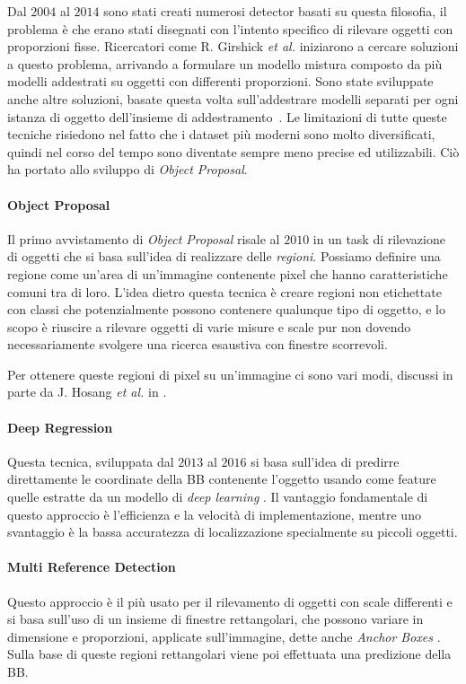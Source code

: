 Dal $2004$ al $2014$ sono stati creati numerosi detector basati su questa filosofia, il problema è che erano stati disegnati con l'intento specifico di rilevare oggetti con proporzioni fisse. Ricercatori come R. Girshick \textit{et al.} iniziarono a cercare soluzioni a questo problema, arrivando a formulare un modello mistura \cite{felzenszwalb2009object} composto da più modelli addestrati su oggetti con differenti proporzioni. Sono state sviluppate anche altre soluzioni, basate questa volta sull'addestrare modelli separati per ogni istanza di oggetto dell'insieme di addestramento \cite{malisiewicz2011ensemble, malisiewicz2011exemplar}. Le limitazioni di tutte queste tecniche risiedono nel fatto che i dataset più moderni sono molto diversificati, quindi nel corso del tempo sono diventate sempre meno precise ed utilizzabili. Ciò ha portato allo sviluppo di \textit{Object Proposal}.
\paragraph{Object Proposal}
Il primo avvistamento di \textit{Object Proposal} risale al $2010$ in un task di rilevazione di oggetti \cite{alexe2010object} che si basa sull'idea di realizzare delle \textit{regioni}.
Possiamo definire una regione come un'area di un'immagine contenente pixel che hanno caratteristiche comuni tra di loro. L'idea dietro questa tecnica è creare regioni non etichettate con classi che potenzialmente possono contenere qualunque tipo di oggetto, e lo scopo è riuscire a rilevare oggetti di varie misure e scale pur non dovendo necessariamente svolgere una ricerca esaustiva con finestre scorrevoli.

Per ottenere queste regioni di pixel su un'immagine ci sono vari modi, discussi in parte da J. Hosang \textit{et al.} in \cite{hosang2015makes}.
\paragraph{Deep Regression}
Questa tecnica, sviluppata dal $2013$ al $2016$ si basa sull'idea di predirre direttamente le coordinate della \ac{BB} contenente l'oggetto usando come feature quelle estratte da un modello di \textit{deep learning} \cite{redmon2016you}. Il vantaggio fondamentale di questo approccio è l'efficienza e la velocità di implementazione, mentre uno svantaggio è la bassa accuratezza di localizzazione specialmente su piccoli oggetti.
\paragraph{Multi Reference Detection}
Questo approccio è il più usato per il rilevamento di oggetti con scale differenti e si basa sull'uso di un insieme di finestre rettangolari, che possono variare in dimensione e proporzioni, applicate sull'immagine, dette anche \textit{Anchor Boxes} \cite{ren2015faster, liu2016ssd, redmon2017yolo9000}. Sulla base di queste regioni rettangolari viene poi effettuata una predizione della \ac{BB}. 
